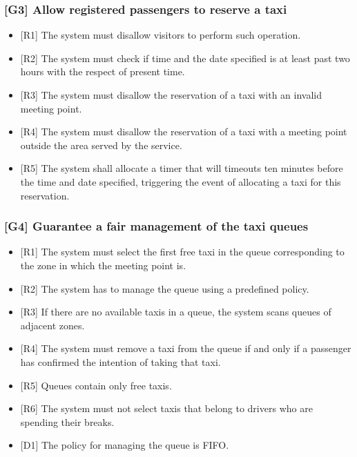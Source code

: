 \documentclass[a4paper,12pt,dvipsnames]{article}%
\begin{document}
\subsubsection{{[}G3{]} Allow registered passengers to reserve a taxi}
\label{goal3}
\begin{itemize}
\item {[}R1{]} The system must disallow visitors to perform such operation.
\item {[}R2{]} The system must check if time and the date specified is at least past two hours with the respect of present time.
\item {[}R3{]} The system must disallow the reservation of a taxi with an invalid meeting point.
\item {[}R4{]} The system must disallow the reservation of a taxi with a meeting point outside the area served by the service.
\item {[}R5{]} The system shall allocate a timer that will timeouts ten minutes before the time and date specified, triggering the event of allocating a taxi for this reservation.
\end{itemize}
\subsubsection{{[}G4{]} Guarantee a fair management of the taxi queues}
\begin{itemize}
\item {[}R1{]} The system must select the first free taxi in the queue corresponding to the zone in which the meeting point is.
\item {[}R2{]} The system has to manage the queue using a predefined policy.
\item {[}R3{]} If there are no available taxis in a queue, the system scans queues of adjacent zones.
\item {[}R4{]} The system must remove a taxi from the queue if and only if a passenger has confirmed the intention of taking that taxi.
\item {[}R5{]} Queues contain only free taxis.
\item {[}R6{]} The system must not select taxis that belong to drivers who are spending their breaks.
\item {[}D1{]} The policy for managing the queue is FIFO.
\end{itemize}
\label{goal4}
\end{document}
